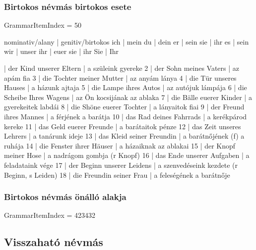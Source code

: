 \documentclass{article}
\newenvironment{desc}{\verbatim}{\endverbatim}
\newenvironment{exmp}{\verbatim}{\endverbatim}
\begin{document}
\subsubsection{Birtokos névmás birtokos esete}

GrammarItemIndex = 50

\begin{desc}
nominativ/alany | genitiv/birtokos 
ich             | mein
du              | dein
er              | sein
sie             | ihr
es              | sein
wir             | unser
ihr             | euer
sie             | ihr
Sie             | Ihr
\end{desc}

\begin{exmp}
1 | der Kind unserer Eltern | a szüleink gyereke
2 | der Sohn meines Vaters | az apám fia
3 | die Tochter meiner Mutter | az anyám lánya
4 | die Tür unseres Hauses | a házunk ajtaja
5 | die Lampe ihres Autos | az autójuk lámpája
6 | die Scheibe Ihres Wagens | az Ön kocsijának az ablaka
7 | die Bälle euerer Kinder | a gyerekeitek labdái
8 | die Shöne euerer Tochter | a lányaitok fiai
9 | der Freund ihres Mannes | a férjének a barátja
10 | das Rad deines Fahrrads | a kerékpárod kereke
11 | das Geld euerer Freunde | a barátaitok pénze
12 | das Zeit unseres Lehrers | a tanárunk ideje
13 | das Kleid seiner Freundin | a barátnőjének (f) a ruhája
14 | die Fenster ihrer Häuser | a házaiknak az ablakai
15 | der Knopf meiner Hose | a nadrágom gombja (r Knopf)
16 | das Ende unserer Aufgaben | a feladataink vége
17 | der Beginn unserer Leidens | a szenvedéseink kezdete (r Beginn, s Leiden)
18 | die Freundin seiner Frau | a feleségének a barátnője
\end{exmp}

\subsubsection{Birtokos névmás önálló alakja}

GrammarItemIndex = 423432

\begin{desc}
\end{desc}

\begin{exmp}
\end{exmp}

\subsection{Visszaható névmás}
\end{document}
